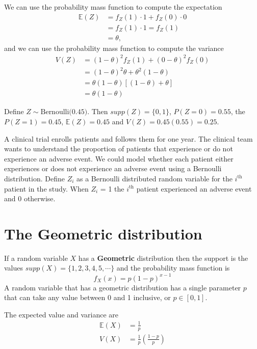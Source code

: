 We can use the probability mass function to compute the expectation
\begin{align}
    \mathbb{E}(Z) &= f_{Z}(1) \cdot 1 + f_{Z}(0) \cdot 0\\
                  &= f_{Z}(1) \cdot 1 = f_{Z}(1)\\
                  &= \theta,
\end{align}
and we can use the probability mass function to compute the variance
\begin{align}
    V(Z) &= (1 - \theta)^{2} f_{Z}(1)+ (0-\theta)^{2} f_{Z}(0) \\
         &= (1 - \theta)^{2} \theta + \theta^{2} (1-\theta)\\
         &= \theta(1-\theta) \left[ (1-\theta) + \theta  \right]\\
         &= \theta(1-\theta)
\end{align}

\ex Define $Z \sim \text{Bernoulli(0.45)}$. Then $supp(Z) = \{0,1\}$, $P(Z=0) = 0.55$, the $P(Z=1) = 0.45$, $\mathbb{E}(Z) = 0.45$ and $V(Z) = 0.45(0.55) = 0.25$. 

\ex A clinical trial enrolls patients and follows them for one year. 
The clinical team wants to understand the proportion of patients that experience or do not experience an adverse event. We could model whether each patient either experiences or does not experience an adverse event using a Bernoulli distribution. Define $Z_{i}$ as a Bernoulli distributed random variable for the $i^\text{th}$ patient in the study. When $Z_{i}$ = 1 the  $i^{\text{th}}$ patient experienced an adverse event and 0 otherwise.


\section{The Geometric distribution }

If a random variable $X$ has a \textbf{Geometric} distribution then the support is the values $supp(X) = \{1,2,3,4,5,\cdots\}$ and the probability mass function is 
\begin{equation}
    f_{X}(x) = p(1-p)^{x-1}
\end{equation}
A random variable that has a geometric distribution has a single parameter $p$ that can take any value between 0 and 1 inclusive, or $p \in [0,1]$.

The expected value and variance are
\begin{align}
    \mathbb{E}(X) &= \frac{1}{p} \\ 
    V(X)          &= \frac{1}{p} \left( \frac{1-p}{p} \right) 
\end{align}

